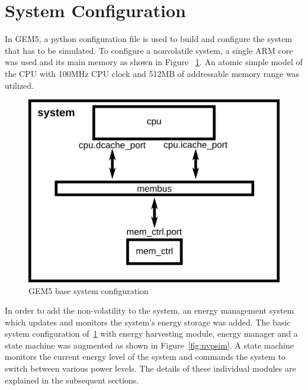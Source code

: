 \documentclass[conference]{IEEEtran}
\begin{document}
\section{\textbf{System Configuration}}
In GEM5, a python configuration file is used to build and configure the system that has to be simulated. To configure a nonvolatile system, a single ARM core was used and its main memory as shown in Figure ~\ref{fig:basic_block}. An atomic simple model of the CPU with 100MHz CPU clock and 512MB of addressable memory range was utilized. 

\begin{figure}[htbp]
\centerline{\includegraphics[scale=0.85]{simple_config.png}}
\caption{GEM5 base system configuration}
\label{fig:basic_block}
\end{figure}

In order to add the non-volatility to the system, an energy management system which updates and monitors the system's energy storage was added. The basic system configuration of~\ref{fig:basic_block} with energy harvesting module, energy manager and a state machine was augmented as shown in Figure~\ref{fig:nvpsim}. A state machine monitors the current energy level of the system and commands the system to switch between various power levels. The details of these individual modules are explained in the subsequent sections.
\end{document}

